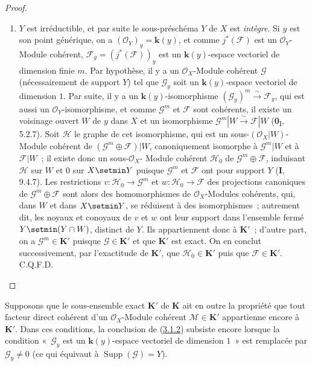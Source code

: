 \begin{proof}
\begin{enumerate}
\item[\textit{b)}] $Y$ est irréductible, et par suite le sous-préschéma $Y$ de $X$ est
\emph{intègre}. Si $y$ est son point générique, on a
$(\mathcal O_Y)_y=\boldsymbol{k}(y)$, et comme $j^*(\mathcal F)$ est un
$\mathcal O_Y$-Module cohérent, $\mathcal F_y=(j^*(\mathcal F))_y$ est un
$\boldsymbol{k}(y)$-espace vectoriel de dimension finie $m$. Par hypothèse, il y a un
$\mathcal O_X$-Module cohérent $\mathcal G$ (nécessairement de support $Y$)
tel que $\mathcal G_y$ soit un $\boldsymbol{k}(y)$-espace vectoriel de dimension $1$. Par
suite, il y a un $\boldsymbol{k}(y)$-isomorphisme
$(\mathcal G_y)^m\xrightarrow{\sim}\mathcal F_y$, qui est aussi un
$\mathcal O_Y$-isomorphisme, et comme $\mathcal G^m$ et $\mathcal F$ sont
cohérents, il existe un voisinage ouvert $W$ de $y$ dans $X$ et un
isomorphisme $\mathcal G^m|W\xrightarrow{\sim}\mathcal F|W$
(\textbf{0}\textsubscript{I}, 5.2.7). Soit $\mathcal H$ le graphe de cet isomorphisme,
qui est un sous-$(\mathcal O_X|W)$-Module cohérent de
$(\mathcal G^m\oplus\mathcal F)|W$, canoniquement isomorphe à
$\mathcal G^m|W$ et à $\mathcal F|W$~; il existe donc un sous-$\mathcal O_X$-%
Module cohérent $\mathcal H_0$ de $\mathcal G^m\oplus\mathcal F$, induisant
$\mathcal H$ sur $W$ et $0$ sur $X\setmin Y$ puisque $\mathcal G^m$ et
$\mathcal F$ ont pour support $Y$ (\textbf{I}, 9.4.7). Les restrictions
$v:\mathcal H_0\to\mathcal G^m$ et $w:\mathcal H_0\to\mathcal F$ des
projections canoniques de $\mathcal G^m\oplus\mathcal F$ sont alors des
homomorphismes de $\mathcal O_X$-Modules cohérents, qui, dans $W$ et dans
$X\setmin Y$, se réduisent à des isomorphismes~; autrement dit, les noyaux et
conoyaux de $v$ et $w$ ont leur support dans l'ensemble fermé
$Y\setmin(Y\cap W)$, distinct de $Y$. Ils appartiennent donc à $\boldsymbol{K}'$~; d'autre
part, on a $\mathcal G^m\in\boldsymbol{K}'$ puisque $\mathcal G\in\boldsymbol{K}'$ et que $\boldsymbol{K}'$ est
exact. On en conclut successivement, par l'exactitude de $\boldsymbol{K}'$, que
$\mathcal H_0\in\boldsymbol{K}'$ puis que $\mathcal F\in\boldsymbol{K}'$. C.Q.F.D.
\end{enumerate}
\end{proof}

\begin{corollary}[3.1.3]
\label{III.3.1.3-fr}
Supposons que le sous-ensemble exact $\boldsymbol{K}'$ de $\boldsymbol{K}$ ait en outre la propriété
que tout facteur direct cohérent d'un $\mathcal O_X$-Module cohérent
$\mathcal M\in\boldsymbol{K}'$ appartienne encore à $\boldsymbol{K}'$. Dans ces conditions, la
conclusion de (\hyperref[III.3.1.2-fr]{3.1.2}) subsiste encore lorsque la
condition «~$\mathcal G_y$ est un $\boldsymbol{k}(y)$-espace vectoriel de dimension $1$~»
est remplacée par $\mathcal G_y\neq0$ (ce qui équivaut à
$\operatorname{Supp}(\mathcal G)=Y$).
\end{corollary}

